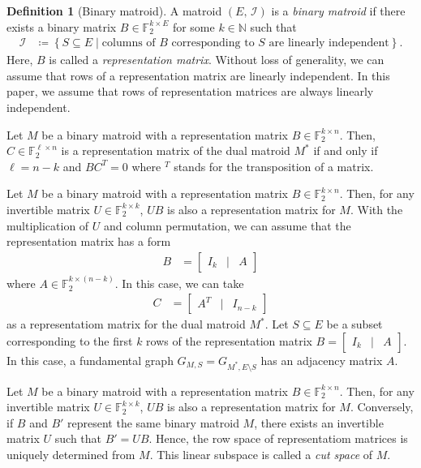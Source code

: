 \documentclass[twoside,10pt]{article}
\theoremstyle{definition}
\newtheorem{definition}[theorem]{Definition}
\theoremstyle{remark}
\begin{document}
\begin{definition}[Binary matroid]
A matroid $(E,\,\mathcal{I})$ is a \textit{binary matroid} if there exists a binary matrix $B\in\mathbb{F}_2^{k\times E}$ for some $k\in\mathbb{N}$ such that
\begin{align*}
\mathcal{I} &\coloneqq\left\{S\subseteq E\mid \text{columns of $B$ corresponding to $S$ are linearly independent}\right\}.
\end{align*}
Here, $B$ is called a \textit{representation matrix}.
Without loss of generality, we can assume that rows of a representation matrix are linearly independent.
In this paper, we assume that rows of representation matrices are always linearly independent.
\end{definition}

Let $M$ be a binary matroid with a representation matrix $B\in\mathbb{F}_2^{k\times n}$.
Then, $C\in\mathbb{F}_2^{\ell\times n}$ is a representation matrix of the dual matroid $M^*$
if and only if $\ell = n-k$ and $BC^T = 0$ where ${}^T$ stands for the transposition of a matrix.

Let $M$ be a binary matroid with a representation matrix $B\in\mathbb{F}_2^{k\times n}$.
Then, for any invertible matrix $U\in\mathbb{F}_2^{k\times k}$, $UB$ is also a representation matrix for $M$.
With the multiplication of $U$ and column permutation, we can assume that the representation matrix has a form
\begin{align*}
B&=\begin{bmatrix}
I_k&\mid& A
\end{bmatrix}
\end{align*}
where $A\in\mathbb{F}_2^{k\times (n-k)}$.
In this case, we can take
\begin{align*}
C&=\begin{bmatrix}
A^T&\mid& I_{n-k}
\end{bmatrix}
\end{align*}
as a representatiom matrix for the dual matroid $M^*$.
Let $S\subseteq E$ be a subset corresponding to the first $k$ rows of the representation matrix $B=\begin{bmatrix}I_k&\mid&A\end{bmatrix}$.
In this case, a fundamental graph $G_{M, S}=G_{M^*, E\setminus S}$ has an adjacency matrix $A$. 

Let $M$ be a binary matroid with a representation matrix $B\in\mathbb{F}_2^{k\times n}$.
Then, for any invertible matrix $U\in\mathbb{F}_2^{k\times k}$, $UB$ is also a representation matrix for $M$.
Conversely, if $B$ and $B'$ represent the same binary matroid $M$, there exists an invertible matrix $U$ such that $B' = UB$.
Hence, the row space of representatiom matrices is uniquely determined from $M$.
This linear subspace is called a \textit{cut space} of $M$.
\end{document}
